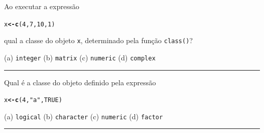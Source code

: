 \documentclass[a4paper,11pt,fleqn]{article}\usepackage[]{graphicx}\usepackage[]{color}
\makeatletter
\newcommand{\hlnum}[1]{\textcolor[rgb]{0,0,0}{#1}}%
\newcommand{\hlstr}[1]{\textcolor[rgb]{0,0,0}{#1}}%
\newcommand{\hlstd}[1]{\textcolor[rgb]{0,0,0}{#1}}%
\newcommand{\hlkwb}[1]{\textcolor[rgb]{0,0,0}{\textbf{#1}}}%
\newcommand{\hlkwd}[1]{\textcolor[rgb]{0,0,0}{\textbf{#1}}}%
\newenvironment{kframe}{%
 \def\at@end@of@kframe{}%
 \ifinner\ifhmode%
  \def\at@end@of@kframe{\end{minipage}}%
  \begin{minipage}{\columnwidth}%
 \fi\fi%
 \def\FrameCommand##1{\hskip\@totalleftmargin \hskip-\fboxsep
 \colorbox{shadecolor}{##1}\hskip-\fboxsep
     \hskip-\linewidth \hskip-\@totalleftmargin \hskip\columnwidth}%
 \MakeFramed {\advance\hsize-\width
   \@totalleftmargin\z@ \linewidth\hsize
   \@setminipage}}%
 {\par\unskip\endMakeFramed%
 \at@end@of@kframe}
\newenvironment{knitrout}{}{} %
\theoremstyle{definition}
\makeatother
\begin{document}
\begin{compactenum}[1.]
\item Ao executar a expressão
\begin{knitrout}\small
{}\color{fgcolor}\begin{kframe}
\begin{alltt}
\hlstd{x} \hlkwb{<-} \hlkwd{c}\hlstd{(}\hlnum{4}\hlstd{,} \hlnum{7}\hlstd{,} \hlnum{10}\hlstd{,} \hlnum{1}\hlstd{)}
\end{alltt}
\end{kframe}
\end{knitrout}
qual a classe do objeto \texttt{x}, determinado pela função \texttt{class()}?
\begin{compactenum}
  \item[] (a) \texttt{integer} \qquad (b) \texttt{matrix} \qquad (c)
    \texttt{numeric} \qquad (d) \texttt{complex}
\end{compactenum}

\end{compactenum}

\vspace{0.3cm}
\hrule
\vspace{0.3cm}

\begin{compactenum}[2.]
\item Qual é a classe do objeto definido pela expressão
\begin{knitrout}\small
{}\color{fgcolor}\begin{kframe}
\begin{alltt}
\hlstd{x} \hlkwb{<-} \hlkwd{c}\hlstd{(}\hlnum{4}\hlstd{,} \hlstr{"a"}\hlstd{,} \hlnum{TRUE}\hlstd{)}
\end{alltt}
\end{kframe}
\end{knitrout}
\begin{compactenum}
  \item[] (a) \texttt{logical} \qquad (b) \texttt{character} \qquad (c)
    \texttt{numeric} \qquad (d) \texttt{factor}
\end{compactenum}

\end{compactenum}

\vspace{0.3cm}
\hrule
\vspace{0.3cm}
\end{document}
